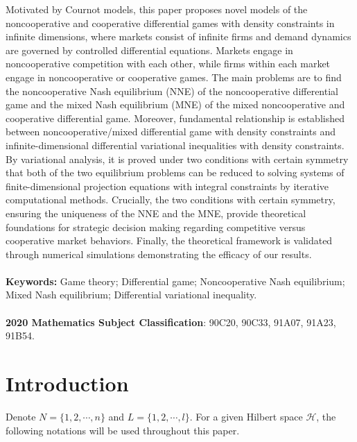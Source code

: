\documentclass[10pt]{article}
\begin{document}
\begin{center}
\begin{minipage}{5.6in}
 Motivated by Cournot models, this paper proposes novel models of the noncooperative and cooperative  differential games with density constraints in infinite dimensions, where markets consist of infinite firms and demand dynamics are governed by controlled differential equations. Markets engage in noncooperative competition with each other, while firms within each market engage in noncooperative or cooperative games. The main problems are to find the noncooperative  Nash equilibrium   (NNE) of the noncooperative differential game and the mixed Nash equilibrium (MNE) of the mixed noncooperative and cooperative differential game. Moreover, fundamental relationship is established between noncooperative/mixed differential game with density constraints and  infinite-dimensional differential variational inequalities with density constraints. By variational analysis, it is proved under two   conditions  with certain symmetry that both of the two equilibrium problems can be reduced to solving systems of finite-dimensional projection equations with integral constraints by iterative computational methods.   Crucially, the two   conditions  with certain symmetry, ensuring the uniqueness of the NNE and the MNE, provide theoretical foundations for strategic decision making regarding competitive versus cooperative market behaviors.  Finally, the theoretical framework is validated through numerical simulations demonstrating the  efficacy of our results.
\\ \ \\
{\bf Keywords:} Game theory; Differential game; Noncooperative Nash equilibrium; Mixed Nash equilibrium; Differential variational inequality.
\\ \ \\
{\bf 2020 Mathematics Subject Classification}: 90C20, 90C33, 91A07, 91A23, 91B54.
\end{minipage}
\end{center}


\section{Introduction}
Denote $N=\{1,2,\cdots,n\}$ and $L=\{1,2,\cdots, l\}$. For a given  Hilbert space $\mathcal{H}$, the following notations will be used throughout this paper.
\end{document}
